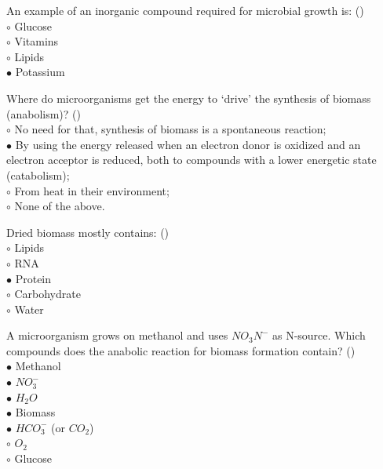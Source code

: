 \documentclass[]{beamer}
\begin{document}
\begin{frame}[shrink] {}
\addtocounter{answers}{1}
\color{blue}
An example of an inorganic compound required for microbial growth is:  ()\\
\color{black}
\setlength{\parindent}{-0.4cm}
{\color{red}$\circ$}  Glucose\\
{\color{red}$\circ$} Vitamins\\
{\color{red}$\circ$} Lipids\\
{\color{red}$\bullet$} Potassium \\
\end{frame}

\begin{frame}[shrink] {}
\addtocounter{answers}{1}
\color{blue}
Where do microorganisms get the energy to ‘drive’ the synthesis of biomass (anabolism)?  ()\\
\color{black}
\setlength{\parindent}{-0.4cm}
{\color{red}$\circ$}  No need for that, synthesis of biomass is a spontaneous reaction;\\
{\color{red}$\bullet$} By using the energy released when an electron donor is oxidized and an electron acceptor is reduced, both to compounds with a lower energetic state (catabolism);\\
{\color{red}$\circ$} From heat in their environment;\\
{\color{red}$\circ$} None of the above. \\
\end{frame}

\begin{frame}[shrink] {}
\addtocounter{answers}{1}
\color{blue}
Dried biomass mostly contains:  ()\\
\color{black}
\setlength{\parindent}{-0.4cm}
{\color{red}$\circ$} Lipids\\
{\color{red}$\circ$} RNA\\
{\color{red}$\bullet$}  Protein \\
{\color{red}$\circ$} Carbohydrate\\
{\color{red}$\circ$} Water \\
\end{frame}

\begin{frame}[shrink] {}
\addtocounter{answers}{1}
\color{blue}
A microorganism grows on methanol and uses $NO_{3}N^{-}$ as N-source. Which compounds does the anabolic reaction for biomass formation contain?   ()\\
\color{black}
\setlength{\parindent}{-0.4cm}
{\color{red}$\bullet$}  Methanol\\
{\color{red}$\bullet$} $NO_{3}^{-}$\\
{\color{red}$\bullet$} ${H_{2}O}$\\
{\color{red}$\bullet$} Biomass\\
{\color{red}$\bullet$} $HCO_{3}^{-}$ (or $CO_2$)\\
{\color{red}$\circ$} $O_2$\\
{\color{red}$\circ$} Glucose \\
\end{frame}
\end{document}
